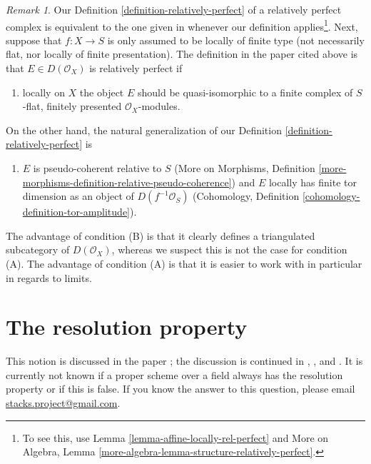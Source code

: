 \documentclass{stacks-project}
\theoremstyle{plain}
\theoremstyle{definition}
\theoremstyle{remark}
\newtheorem{remark}[subsection]{Remark}
\numberwithin{equation}{subsection}
\begin{document}
\begin{remark}
\label{remark-discuss-rel-perfect}
Our Definition \ref{definition-relatively-perfect} of a
relatively perfect complex is equivalent to the one given
in \cite{lieblich-complexes} whenever our definition applies\footnote{To
see this, use Lemma \ref{lemma-affine-locally-rel-perfect} and
More on Algebra, Lemma \ref{more-algebra-lemma-structure-relatively-perfect}.}.
Next, suppose that $f : X \to S$ is only assumed to be locally
of finite type (not necessarily flat, nor locally of finite
presentation). The definition in the paper cited above is that
$E \in D(\mathcal{O}_X)$ is relatively perfect if
\begin{enumerate}
\item[(A)] locally on $X$ the object $E$ should be
quasi-isomorphic to a finite complex of
$S$-flat, finitely presented $\mathcal{O}_X$-modules.
\end{enumerate}
On the other hand, the natural generalization of our
Definition \ref{definition-relatively-perfect} is
\begin{enumerate}
\item[(B)] $E$ is pseudo-coherent relative to $S$
(More on Morphisms, Definition
\ref{more-morphisms-definition-relative-pseudo-coherence})
and $E$ locally has finite tor dimension as an object of
$D(f^{-1}\mathcal{O}_S)$
(Cohomology, Definition \ref{cohomology-definition-tor-amplitude}).
\end{enumerate}
The advantage of condition (B) is that it clearly defines a triangulated
subcategory of $D(\mathcal{O}_X)$, whereas we suspect this is not
the case for condition (A). The advantage of condition (A)
is that it is easier to work with in particular in regards to limits.
\end{remark}









\section{The resolution property}
\label{section-resolution-property}

\noindent
This notion is discussed in the paper \cite{totaro_resolution};
the discussion is continued in \cite{Gross-thesis},
\cite{Gross-surface}, and \cite{Gross-stack}.
It is currently not known if a proper scheme over a field
always has the resolution property or if this is false.
If you know the answer to this question, please email
\href{mailto:stacks.project@gmail.com}{stacks.project@gmail.com}.
\end{document}
